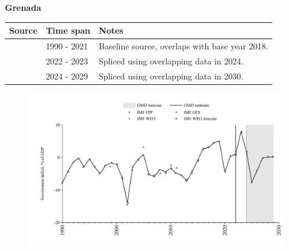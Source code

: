 \documentclass[12pt,a4paper,landscape]{article}
\begin{document}
\begin{adjustbox}{max totalsize={\paperwidth}{\paperheight},center}
\begin{minipage}[t][\textheight][t]{\textwidth}
\vspace*{0.5cm}
{}
\begin{center}
{\Large\bfseries Grenada}
\end{center}
\vspace{0.5cm}
\begin{table}[H]
\centering
\small
\begin{tabular}{|l|l|l|}
\hline
\textbf{Source} & \textbf{Time span} & \textbf{Notes} \\
\hline
\rowcolor{white}\cite{IMF_WEO}& 1990 - 2021 &Baseline source, overlaps with base year 2018.\\
\rowcolor{lightgray}\cite{IMF_FPP}& 2022 - 2023 &Spliced using overlapping data in 2024.\\
\rowcolor{white}\cite{IMF_WEO_forecast}& 2024 - 2029 &Spliced using overlapping data in 2030.\\
\hline
\end{tabular}
\end{table}
\begin{figure}[H]
\centering
\includegraphics[width=\textwidth,height=0.6\textheight,keepaspectratio]{graphs/GRD_govdef_GDP.pdf}
\end{figure}
\end{minipage}
\end{adjustbox}
\end{document}
